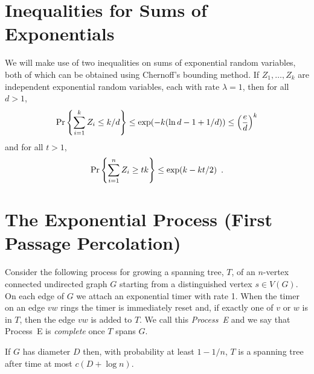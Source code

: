 \documentclass{patmorin}
\begin{document}
\section{Inequalities for Sums of Exponentials}

We will make use of two inequalities on sums of exponential random variables, both of which can be obtained using Chernoff's bounding method.  If $Z_1,\ldots,Z_k$ are independent exponential random variables, each with rate $\lambda=1$, then for all $d>1$,
\begin{equation}
    \Pr\left\{\sum_{i=1}^k Z_i \le k/d\right\} \le \exp(-k(\ln d -1 + 1/d)) \le \left(\frac{e}{d}\right)^k  \eqlabel{head-bound}
\end{equation}
and for all $t>1$, 
\begin{equation}
    \Pr\left\{\sum_{i=1}^n Z_i \ge tk\right\} \le \exp (k- k t/2) \enspace . \eqlabel{tail-bound}
\end{equation}


\section{The Exponential Process (First Passage Percolation)}

Consider the following process for growing a spanning tree, $T$, of an
$n$-vertex connected undirected graph $G$ starting from a distinguished
vertex $s\in V(G)$.  On each edge of $G$ we attach an exponential timer
with rate 1. When the timer on an edge $vw$ rings the timer is immediately
reset and, if exactly one of $v$ or $w$ is in $T$, then the edge $vw$
is added to $T$.  We call this \emph{Process~E} and we say that Process~E
is \emph{complete} once $T$ spans $G$.

\begin{lem}
  If $G$ has diameter $D$ then, with probability at least $1-1/n$, $T$
  is a spanning tree after time at most $c(D+\log n)$.
\end{lem}
\end{document}
